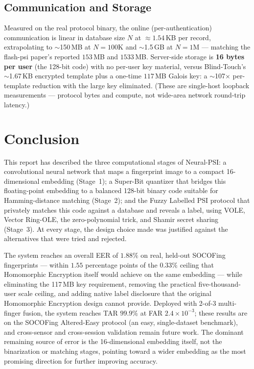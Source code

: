 \documentclass[11pt]{article}
\begin{document}
\subsection{Communication and Storage}

Measured on the real protocol binary, the online (per-authentication) communication is linear in
database size $N$ at $\approx 1.54$\,KB per record, extrapolating to $\sim$150\,MB at $N=100$K and
$\sim$1.5\,GB at $N=1$M --- matching the flash-psi paper's reported $153$\,MB and $1533$\,MB.
Server-side storage is \textbf{16 bytes per user} (the 128-bit code) with no per-user key material,
versus Blind-Touch's $\sim$1.67\,KB encrypted template plus a one-time $117$\,MB Galois key: a
$\sim$107$\times$ per-template reduction with the large key eliminated. (These are single-host
loopback measurements --- protocol bytes and compute, not wide-area network round-trip latency.)

\section{Conclusion}

This report has described the three computational stages of Neural-PSI: a convolutional
neural network that maps a fingerprint image to a compact 16-dimensional embedding
(Stage~1); a Super-Bit quantizer that bridges this floating-point embedding to a balanced
128-bit binary code suitable for Hamming-distance matching (Stage~2); and the Fuzzy
Labelled PSI protocol that privately matches this code against a database and reveals a
label, using VOLE, Vector Ring-OLE, the zero-polynomial trick, and Shamir secret sharing
(Stage~3). At every stage, the design choice made was justified against the alternatives
that were tried and rejected.

The system reaches an overall EER of $1.88\%$ on real, held-out SOCOFing fingerprints ---
within $1.55$ percentage points of the $0.33\%$ ceiling that Homomorphic Encryption itself
would achieve on the same embedding --- while eliminating the 117\,MB key requirement,
removing the practical five-thousand-user scale ceiling, and adding native label
disclosure that the original Homomorphic Encryption design cannot provide. Deployed with
2-of-3 multi-finger fusion, the system reaches TAR $99.9\%$ at FAR $2.4\times10^{-3}$; these
results are on the SOCOFing Altered-Easy protocol (an easy, single-dataset benchmark), and
cross-sensor and cross-session validation remain future work. The dominant
remaining source of error is the 16-dimensional embedding itself, not the binarization or
matching stages, pointing toward a wider embedding as the most promising direction for
further improving accuracy.
\end{document}
